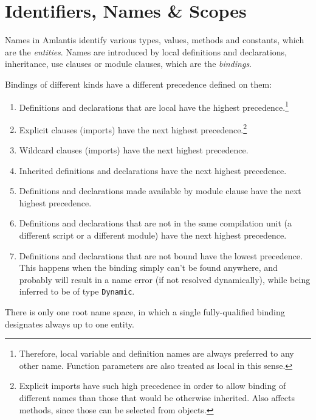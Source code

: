 
\chapter{Identifiers, Names \& Scopes}
\label{sec:identifiers-names-scopes}

Names in Amlantis identify various types, values, methods and constants, which are the \emph{entities}. Names are introduced by local definitions and declarations, inheritance, use clauses or module clauses, which are the \emph{bindings}. 

Bindings of different kinds have a different precedence defined on them: 

\begin{enumerate}
  \item Definitions and declarations that are local have the highest precedence.\footnote{Therefore, local variable and definition names are always preferred to any other name. Function parameters are also treated as local in this sense.} 
  \item Explicit \lstinline@use@ clauses (imports) have the next highest precedence.\footnote{Explicit imports have such high precedence in order to allow binding of different names than those that would be otherwise inherited. Also affects methods, since those can be selected from objects.} 
  \item Wildcard \lstinline@use@ clauses (imports) have the next highest precedence.
  \item Inherited definitions and declarations have the next highest precedence. 
  \item Definitions and declarations made available by module clause have the next highest precedence. 
  \item Definitions and declarations that are not in the same compilation unit (a different script or a different module) have the next highest precedence. 
  \item Definitions and declarations that are not bound have the lowest precedence. This happens when the binding simply can't be found anywhere, and probably will result in a name error (if not resolved dynamically), while being inferred to be of type \lstinline!Dynamic!. 
\end{enumerate}

There is only one root name space, in which a single fully-qualified binding designates always up to one entity. 

